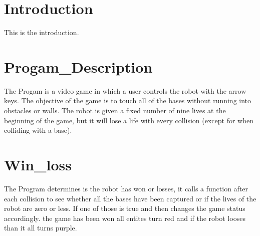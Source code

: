 \hypertarget{index_intro_sec}{}\section{Introduction}\label{index_intro_sec}
This is the introduction.\hypertarget{index_Progam_Description}{}\section{Progam\+\_\+\+Description}\label{index_Progam_Description}
The Progam is a video game in which a user controls the robot with the arrow keys. The objective of the game is to touch all of the bases without running into obstacles or walls. The robot is given a fixed number of nine lives at the beginning of the game, but it will lose a life with every collision (except for when colliding with a base).\hypertarget{index_Win_loss}{}\section{Win\+\_\+loss}\label{index_Win_loss}
The Program determines is the robot has won or losses, it calls a function after each collision to see whether all the bases have been captured or if the lives of the robot are zero or less. If one of those is true and then changes the game status accordingly. the game has been won all entites turn red and if the robot looses than it all turns purple. 